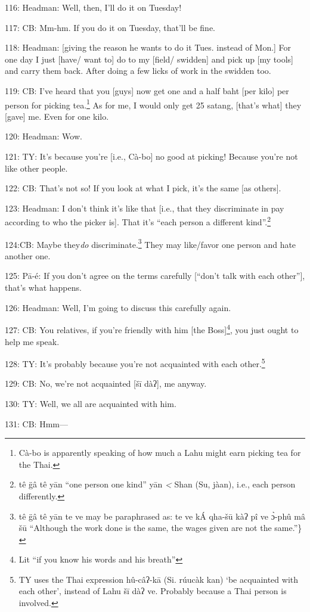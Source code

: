 116: Headman: Well, then, I'll do it on Tuesday!

117: CB: Mm-hm.  If you do it on Tuesday, that'll be fine.

118: Headman: [giving the reason he wants to do it Tues. instead of Mon.] For one
day I just [have/ want to] do to my [field/ swidden] and pick up [my tools] and
carry them back.  After doing a few licks of work in the swidden too.

119: CB: I've heard that you [guys] now get one and a half baht [per kilo] per
person for picking tea.\footnote{Cà-bo is apparently speaking of how much a Lahu might earn picking tea for the Thai.}  As for me, I would only get 25 satang, [that's what]
they [gave] me.  Even for one kilo.

120: Headman: Wow.

121: TY: It's because you're [i.e., Cà-bo] no good at picking!  Because you're
not like other people.

122: CB: That's not so!  If you look at what I pick, it's the same [as others].

123: Headman: I don't think it's like that [i.e., that they discriminate in pay
according to who the picker is].  That it's ``each person a different kind''.\footnote{tê g̈â tê yān ``one person one kind'' yān\textit{ <} Shan (Su, jàan), i.e., each person differently.}

124:CB: Maybe they\textit{do} discriminate.\footnote{tê g̈â tê yān te ve may be paraphrased as: te ve kÁ qha-šū kàʔ pî ve ɔ̀-phû mâ šū ``Although the work done is the same, the wages given are not the same.''\}}  They may like/favor one person
and hate another one.

125: Pā-é: If you don't agree on the terms carefully [``don't talk with each
other''], that's what happens.

126: Headman: Well, I'm going to discuss this carefully again.

127: CB: You relatives, if you're friendly with him [the Boss]\footnote{Lit ``if you know his words and his breath''}, you just ought
to help me speak.

128: TY: It's probably because you're not acquainted with each other.\footnote{TY uses the Thai expression hû-câʔ-kā (Si. rúucàk kan) `be acquainted with each other', instead of Lahu šī dàʔ ve.  Probably because a Thai person is involved.}

129: CB: No, we're not acquainted [šī dàʔ], me anyway.

130: TY: Well, we all are acquainted with him.

131: CB: Hmm---

